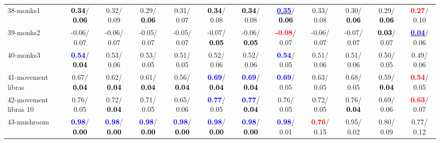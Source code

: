 \begin{table}[h]
\begin{center}
{\begin{tabular}{lc|c|c|c|c|c|c|c|c|c|c}
38-monks1 & \textcolor{black}{\textbf{  0.34}}/\textcolor{black}{\textbf{  0.06}} &   0.32/  0.09 &   0.29/\textcolor{black}{\textbf{  0.06}} &   0.31/  0.07 & \textcolor{black}{\textbf{  0.34}}/  0.08 & \textcolor{black}{\textbf{  0.34}}/  0.08 & \underline{\textcolor{blue}{\textbf{  0.35}}}/\textcolor{black}{\textbf{  0.06}} &   0.33/  0.08 &   0.30/\textcolor{black}{\textbf{  0.06}} &   0.29/\textcolor{black}{\textbf{  0.06}} & \textcolor{red}{\textbf{  0.27}}/  0.10 \\
39-monks2 &  -0.06/  0.07 &  -0.06/  0.07 &  -0.05/  0.07 &  -0.05/  0.07 &  -0.07/\textcolor{black}{\textbf{  0.05}} &  -0.06/\textcolor{black}{\textbf{  0.05}} & \textcolor{red}{\textbf{ -0.08}}/  0.07 &  -0.06/  0.07 &  -0.07/  0.07 & \textcolor{black}{\textbf{  0.03}}/  0.07 & \underline{\textcolor{blue}{\textbf{  0.04}}}/  0.06 \\ \hline
40-monks3 & \textcolor{blue}{\textbf{  0.54}}/\textcolor{black}{\textbf{  0.04}} &   0.53/  0.06 &   0.53/  0.05 &   0.51/  0.05 &   0.52/  0.06 &   0.52/  0.06 & \textcolor{blue}{\textbf{  0.54}}/  0.05 &   0.51/  0.06 &   0.51/  0.06 &   0.50/  0.05 &   0.49/  0.06 \\
41-movement libras &   0.67/\textcolor{black}{\textbf{  0.04}} &   0.62/\textcolor{black}{\textbf{  0.04}} &   0.61/\textcolor{black}{\textbf{  0.04}} &   0.56/\textcolor{black}{\textbf{  0.04}} & \textcolor{blue}{\textbf{  0.69}}/\textcolor{black}{\textbf{  0.04}} & \textcolor{blue}{\textbf{  0.69}}/\textcolor{black}{\textbf{  0.04}} & \textcolor{blue}{\textbf{  0.69}}/  0.05 &   0.63/  0.05 &   0.68/  0.05 &   0.59/\textcolor{black}{\textbf{  0.04}} & \textcolor{red}{\textbf{  0.54}}/  0.05 \\
42-movement libras 10 &   0.76/  0.05 &   0.72/\textcolor{black}{\textbf{  0.04}} &   0.71/  0.05 &   0.65/  0.06 & \textcolor{blue}{\textbf{  0.77}}/  0.05 & \textcolor{blue}{\textbf{  0.77}}/\textcolor{black}{\textbf{  0.04}} &   0.76/  0.05 &   0.72/  0.05 &   0.76/\textcolor{black}{\textbf{  0.04}} &   0.69/  0.06 & \textcolor{red}{\textbf{  0.63}}/  0.07 \\
43-mushroom & \textcolor{blue}{\textbf{  0.98}}/\textcolor{black}{\textbf{  0.00}} & \textcolor{blue}{\textbf{  0.98}}/\textcolor{black}{\textbf{  0.00}} & \textcolor{blue}{\textbf{  0.98}}/\textcolor{black}{\textbf{  0.00}} & \textcolor{blue}{\textbf{  0.98}}/\textcolor{black}{\textbf{  0.00}} & \textcolor{blue}{\textbf{  0.98}}/\textcolor{black}{\textbf{  0.00}} & \textcolor{blue}{\textbf{  0.98}}/\textcolor{black}{\textbf{  0.00}} & \textcolor{blue}{\textbf{  0.98}}/  0.01 & \textcolor{red}{\textbf{  0.76}}/  0.15 &   0.95/  0.02 &   0.80/  0.09 &   0.77/  0.12 \\

\end{tabular}}
\end{center}
\end{table}
